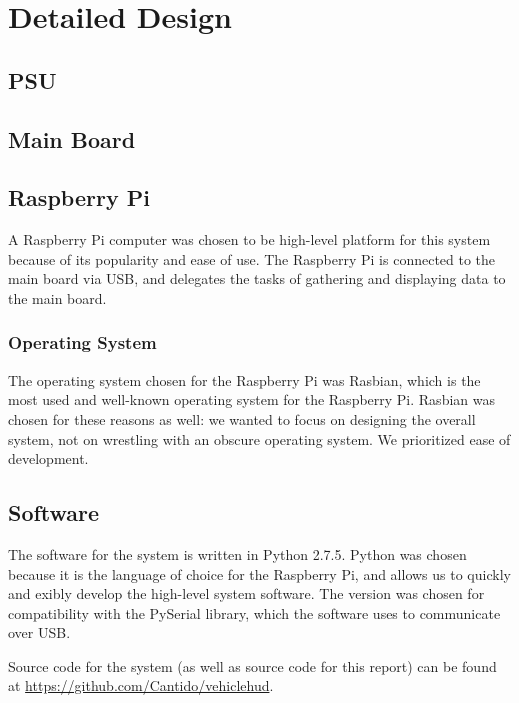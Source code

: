 \chapter{Detailed Design}

\section{PSU}

\section{Main Board}

\section{Raspberry Pi}

A Raspberry Pi computer was chosen to be high-level platform for this system
because of its popularity and ease of use. The Raspberry Pi is connected to the
main board via USB, and delegates the tasks of gathering and displaying data
to the main board.

\subsection{Operating System}
The operating system chosen for the Raspberry Pi was Rasbian, which is the
most used and well-known operating system for the Raspberry Pi. Rasbian was
chosen for these reasons as well: we wanted to focus on designing the overall
system, not on wrestling with an obscure operating system. We prioritized ease
of development.

\section{Software}
The software for the system is written in Python 2.7.5. Python was chosen
because it is the language of choice for the Raspberry Pi, and allows us to
quickly and 
exibly develop the high-level system software. The version was
chosen for compatibility with the PySerial library, which the software uses to
communicate over USB.

Source code for the system (as well as source code for this report) can be
found at \url{https://github.com/Cantido/vehiclehud}.
